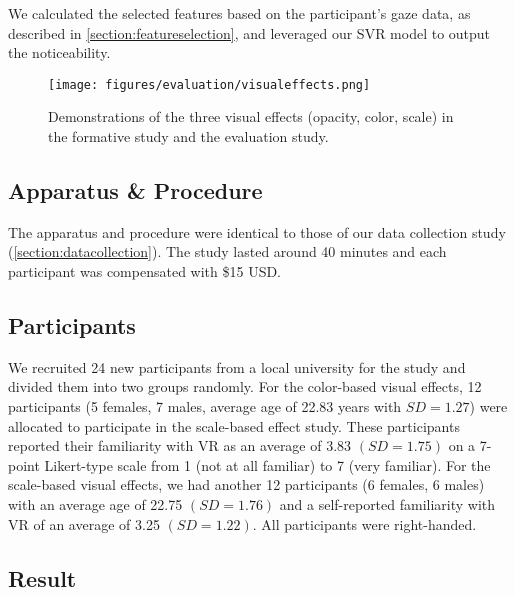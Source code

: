 We calculated the selected features based on the participant's gaze data, as described in \autoref{section:featureselection}, and leveraged our SVR model to output the noticeability.


\begin{figure}[htbp]
    \centering
    \texttt{[image: figures/evaluation/visualeffects.png]}
    \caption{Demonstrations of the three visual effects (opacity, color, scale) in the formative study and the evaluation study.}
    \label{figure:visualeffects}
\end{figure}


\subsection{Apparatus \& Procedure}
The apparatus and procedure were identical to those of our data collection study (\autoref{section:datacollection}). 
The study lasted around 40 minutes and each participant was compensated with \$15 USD.

\subsection{Participants}

We recruited 24 new participants from a local university for the study and divided them into two groups randomly.
For the color-based visual effects, 12 participants (5 females, 7 males, average age of 22.83 years with $SD=1.27$) were allocated to participate in the scale-based effect study.
These participants reported their familiarity with VR as an average of 3.83 $(SD=1.75)$ on a 7-point Likert-type scale from 1 (not at all familiar) to 7 (very familiar).
For the scale-based visual effects, we had another 12 participants (6 females, 6 males) with an average age of 22.75 $(SD=1.76)$ and a self-reported familiarity with VR of an average of 3.25 $(SD=1.22)$.
All participants were right-handed.

\subsection{Result}

